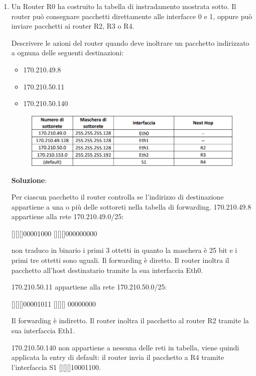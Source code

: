 \documentclass[11pt,a4paper,oneside]{book}
\theoremstyle{definition}
\begin{document}
\begin{enumerate}
	\item Un Router R0 ha costruito la tabella di instradamento mostrata sotto. Il router può
	      consegnare pacchetti direttamente alle interfacce 0 e 1, oppure può inviare
	      pacchetti ai router R2, R3 o R4.

	      Descrivere le azioni del router quando deve
	      inoltrare un pacchetto indirizzato a ognuna delle seguenti destinazioni:

	      \begin{itemize}
		      \item 170.210.49.8
		      \item 170.210.50.11
		      \item 170.210.50.140
	      \end{itemize}

	      \begin{figure}[!h]
		      \includegraphics[scale=0.5]{Immagini/Eser1.png}
		      \centering
	      \end{figure}

	      \pagebreak

	      \textbf{Soluzione}:

	      Per ciascun pacchetto il router controlla se l’indirizzo di destinazione appartiene a una o più delle sottoreti nella tabella di forwarding.
	      170.210.49.8 appartiene alla rete 170.210.49.0/25:

	      [][][]00001000 [][][]000000000

	      non traduco in binario i primi 3 ottetti in quanto la maschera è 25 bit e i primi tre ottetti sono uguali. Il forwarding è diretto. Il router inoltra il pacchetto all’host destinatario tramite la sua interfaccia Eth0.


	      170.210.50.11 appartiene alla rete 170.210.50.0/25:

	      [][][]00001011 [][][] 00000000

	      Il forwarding è indiretto. Il router inoltra il pacchetto al router R2 tramite la sua interfaccia Eth1.

	      170.210.50.140 non appartiene a nessuna delle reti in tabella, viene quindi applicata la entry di default: il router invia il pacchetto a R4 tramite l’interfaccia S1
		      [][][]10001100.


\end{enumerate}
\end{document}
